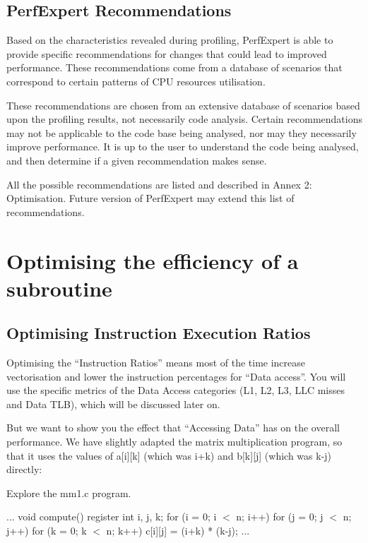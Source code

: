 \subsection{PerfExpert Recommendations}
\label{subsec:Recommendations}

Based on the characteristics revealed during profiling, PerfExpert is able to provide specific recommendations for changes that could lead to improved performance. These recommendations come from a database of scenarios that correspond to certain patterns of CPU resources utilisation.

These recommendations are chosen from an extensive database of scenarios based upon the profiling results, not necessarily code analysis. Certain recommendations may not be applicable to the code base being analysed, nor may they necessarily improve performance. It is up to the user to understand the code being analysed, and then determine if a given recommendation makes sense.

All the possible recommendations are listed and described in Annex 2: Optimisation. Future version of PerfExpert may extend this list of recommendations.

\section{Optimising the efficiency of a subroutine}
\label{sec:Optimizing_the_efficiency_of_a_subroutine}

\subsection{Optimising Instruction Execution Ratios}
\label{subsec:Optimizing_Instruction_Execution_Ratios}

Optimising the ``Instruction Ratios'' means most of the time increase vectorisation and lower the instruction percentages for ``Data access''. You will use the specific metrics of the Data Access categories (L1, L2, L3, LLC misses and Data TLB), which will be discussed later on.

But we want to show you the effect that ``Accessing Data'' has on the overall performance. We have slightly adapted the matrix multiplication program, so that it uses the values of a[i][k] (which was i+k) and b[k][j] (which was k-j) directly:

Explore the mm1.c program.

\begin{prompt}
...
void compute()
{
 register int i, j, k;
 for (i = 0; i $<$ n; i++)
   for (j = 0; j $<$ n; j++)
     for (k = 0; k $<$ n; k++)
       c[i][j] = (i+k) * (k-j);
}
...
\end{prompt}

